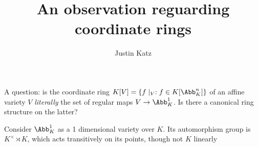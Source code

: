 \documentclass[11pt]{amsart}
\title{An observation reguarding coordinate rings}
\author{Justin Katz}
\begin{document}
\maketitle
A question: is the coordinate ring $K[V]=\{ f \mid_V : f \in K[\Abb_K^n] \}$ of an affine variety $V$ \emph{literally} the set of regular maps $V \to \Abb^1_K$. Is there a canonical ring structure on the latter?

Consider $\Abb^1_K$ as a 1 dimensional variety over $K$. Its automorphism group is $K^\times \rtimes K$, which acts transitively on its points, though not $K$ linearly




\end{document}
